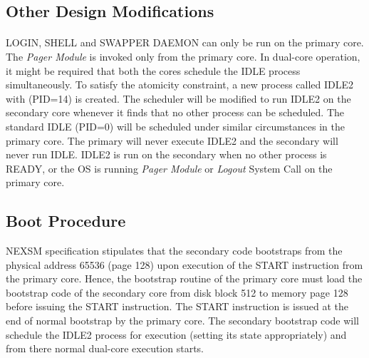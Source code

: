 \documentclass[12pt]{report}
\begin{document}
\subsection{Other Design Modifications}
\paragraph{}
LOGIN, SHELL and SWAPPER DAEMON can only be run on the primary core. The \emph{Pager Module} is invoked only from the primary core. In dual-core operation, it might be required that both the cores schedule the IDLE process simultaneously. To satisfy the atomicity constraint, a new process called IDLE2 with (PID=14) is created. The scheduler will be modified to run IDLE2 on the secondary core whenever it finds that no other process can be scheduled. The standard IDLE (PID=0) will be scheduled under similar circumstances in the primary core. The primary will never execute IDLE2 and the secondary will never run IDLE. IDLE2 is run on the secondary when no other process is READY, or the OS is running \emph{Pager Module} or \emph{Logout} System Call on the primary core.

\subsection{Boot Procedure}
NEXSM specification stipulates that the secondary code bootstraps from the physical address 65536 (page 128) upon execution of the START instruction from the primary core. Hence, the bootstrap routine of the primary core must load the bootstrap code of the secondary core from disk block 512 to memory page 128 before issuing the START instruction. The START instruction is issued at the end of normal bootstrap by the primary core. The secondary bootstrap code will schedule the IDLE2 process for execution (setting its state appropriately) and from there normal dual-core execution starts.
\end{document}
